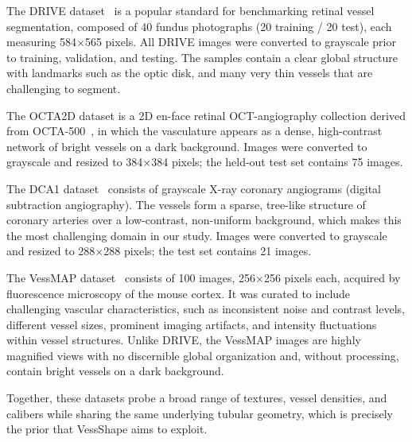 \documentclass[twocolumn]{article}
\begin{document}
The DRIVE dataset~\cite{Staal2004} is a popular standard for benchmarking retinal vessel segmentation, composed of 40 fundus photographs (20 training / 20 test), each measuring 584$\times$565 pixels. All DRIVE images were converted to grayscale prior to training, validation, and testing. The samples contain a clear global structure with landmarks such as the optic disk, and many very thin vessels that are challenging to segment.

The OCTA2D dataset is a 2D en-face retinal OCT-angiography collection derived from OCTA-500~\cite{Li2020_OCTA500}, in which the vasculature appears as a dense, high-contrast network of bright vessels on a dark background. Images were converted to grayscale and resized to 384$\times$384 pixels; the held-out test set contains 75 images.

The DCA1 dataset~\cite{Cervantes2019} consists of grayscale X-ray coronary angiograms (digital subtraction angiography). The vessels form a sparse, tree-like structure of coronary arteries over a low-contrast, non-uniform background, which makes this the most challenging domain in our study. Images were converted to grayscale and resized to 288$\times$288 pixels; the test set contains 21 images.

The VessMAP dataset~\cite{viana2025new} consists of 100 images, 256$\times$256 pixels each, acquired by fluorescence microscopy of the mouse cortex. It was curated to include challenging vascular characteristics, such as inconsistent noise and contrast levels, different vessel sizes, prominent imaging artifacts, and intensity fluctuations within vessel structures. Unlike DRIVE, the VessMAP images are highly magnified views with no discernible global organization and, without processing, contain bright vessels on a dark background.

Together, these datasets probe a broad range of textures, vessel densities, and calibers while sharing the same underlying tubular geometry, which is precisely the prior that VessShape aims to exploit.


\end{document}
